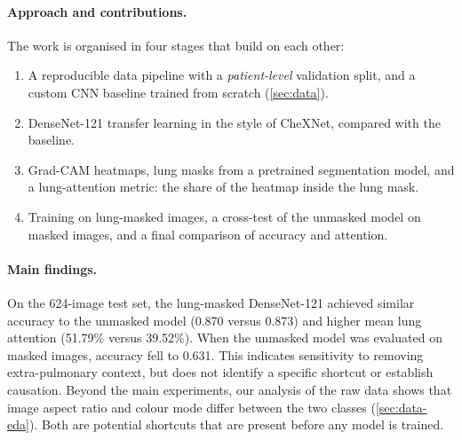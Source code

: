 \paragraph{Approach and contributions.}
The work is organised in four stages that build on each other:
\begin{enumerate}
  \item A reproducible data pipeline with a \emph{patient-level} validation split, and a custom CNN baseline trained from scratch (\cref{sec:data}).
  \item DenseNet-121 transfer learning in the style of CheXNet, compared with the baseline.
  \item Grad-CAM heatmaps, lung masks from a pretrained segmentation model, and a lung-attention metric: the share of the heatmap inside the lung mask.
  \item Training on lung-masked images, a cross-test of the unmasked model on masked images, and a final comparison of accuracy and attention.
\end{enumerate}
  \paragraph{Main findings.}
  On the 624-image test set, the lung-masked DenseNet-121 achieved similar accuracy to the unmasked model (0.870 versus 0.873)
  and higher mean lung attention (51.79\% versus 39.52\%). When the unmasked model was evaluated on masked images, accuracy fell to 0.631.
  This indicates sensitivity to removing extra-pulmonary context, but does not identify a specific shortcut or establish causation.
Beyond the main experiments, our analysis of the raw data shows that image aspect ratio and colour mode differ between the two classes (\cref{sec:data-eda}).
Both are potential shortcuts that are present before any model is trained.
